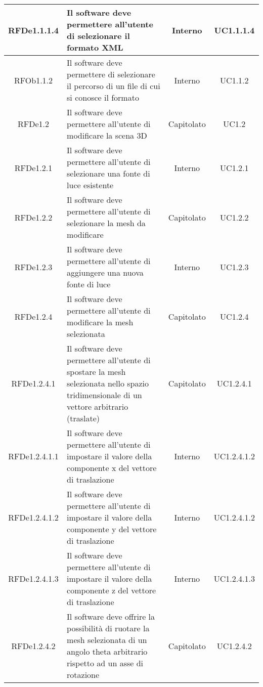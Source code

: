 \begin{longtable}{|c|p{6cm}|c|c|}
\midrule
RFDe1.1.1.4
& Il software deve permettere all'utente di selezionare il formato XML
& Interno
& UC1.1.1.4
\\


\midrule
RFOb1.1.2
& Il software deve permettere di selezionare il percorso di un file di cui si conosce il formato
& Interno
& UC1.1.2
\\


\midrule
RFDe1.2
& Il software deve permettere all'utente di modificare la scena 3D
& Capitolato
& UC1.2
\\


\midrule
RFDe1.2.1
& Il software deve permettere all'utente di selezionare una fonte di luce esistente
& Interno
& UC1.2.1
\\


\midrule
RFDe1.2.2
& Il software deve permettere all'utente di selezionare la mesh da modificare
& Capitolato
& UC1.2.2
\\


\midrule
RFDe1.2.3
& Il software deve permettere all'utente di aggiungere una nuova fonte di luce
& Interno
& UC1.2.3
\\


\midrule
RFDe1.2.4
& Il software deve permettere all'utente di modificare la mesh selezionata
& Capitolato
& UC1.2.4
\\


\midrule
RFDe1.2.4.1
& Il software deve permettere all'utente di spostare la mesh selezionata nello spazio tridimensionale di un vettore arbitrario (traslate)
& Capitolato
& UC1.2.4.1
\\


\midrule
RFDe1.2.4.1.1
& Il software deve permettere all'utente di impostare il valore della componente x del vettore di traslazione
& Interno
& UC1.2.4.1.2
\\


\midrule
RFDe1.2.4.1.2
& Il software deve permettere all'utente di impostare il valore della componente y del vettore di traslazione
& Interno
& UC1.2.4.1.2
\\


\midrule
RFDe1.2.4.1.3
& Il software deve permettere all'utente di impostare il valore della componente z del vettore di traslazione
& Interno
& UC1.2.4.1.3
\\


\midrule
RFDe1.2.4.2
& Il software deve offrire la possibilità di ruotare la mesh selezionata di un angolo theta arbitrario rispetto ad un asse di rotazione
& Capitolato
& UC1.2.4.2
\\



\end{longtable}
